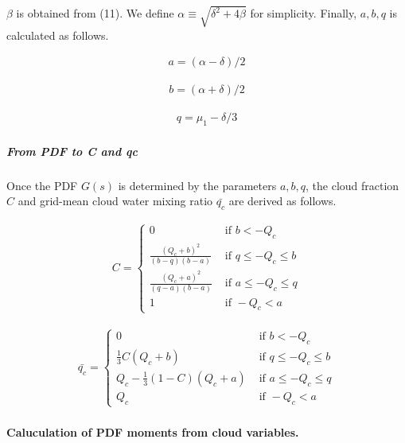 \(\beta\) is obtained from (11). We define \(\alpha \equiv\sqrt{\delta^{2}+4 \beta}\) for simplicity. Finally, \(a,b,q\) is calculated as follows.

\begin{eqnarray}
a=(\alpha-\delta) / 2
\end{eqnarray}

\begin{eqnarray}
b=(\alpha+\delta) / 2
\end{eqnarray}

\begin{eqnarray}
q=\mu_{1}-\delta / 3
\end{eqnarray}

\hypertarget{from-pdf-to-c-and-qc}{%
\subparagraph{From PDF to C and qc}\label{from-pdf-to-c-and-qc}}

Once the PDF \(G(s)\) is determined by the parameters \(a,b,q\), the cloud fraction \(C\) and grid-mean cloud water mixing ratio \(\bar{q_c}\) are derived as follows.

\begin{eqnarray}
C=\left\{\begin{array}{ll}
0 & \text { if } b<-Q_{c} \\
\frac{\left(Q_{c}+b\right)^{2}}{(b-q)(b-a)} & \text { if } q \leq-Q_{c} \leq b \\
\frac{\left(Q_{c}+a\right)^{2}}{(q-a)(b-a)} & \text { if } a \leq-Q_{c} \leq q \\
1 & \text { if }-Q_{c}<a
\end{array}\right.
\label{E08-15}
\end{eqnarray}

\begin{eqnarray}
\bar{q_c}=\left\{\begin{array}{ll}
0 & \text { if } b<-Q_{c} \\
\frac{1}{3} C\left(Q_{c}+b\right) & \text { if } q \leq-Q_{c} \leq b \\
Q_{c}-\frac{1}{3}(1-C)\left(Q_{c}+a\right) & \text { if } a \leq-Q_{c} \leq q \\
Q_{c} & \text { if }-Q_{c}<a
\end{array}\right.
\label{E08-16}
\end{eqnarray}

\hypertarget{caluculation-of-pdf-moments-from-cloud-variables.}{%
\paragraph{Caluculation of PDF moments from cloud variables.}\label{caluculation-of-pdf-moments-from-cloud-variables.}}

